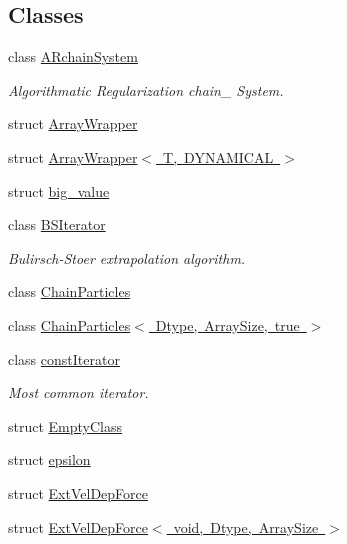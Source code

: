 \subsection*{Classes}
\begin{DoxyCompactItemize}
\item 
class \mbox{\hyperlink{class_space_h_1_1_a_rchain_system}{A\+Rchain\+System}}
\begin{DoxyCompactList}\small\item\em Algorithmatic Regularization chain_ System. \end{DoxyCompactList}\item
struct \mbox{\hyperlink{struct_space_h_1_1_array_wrapper}{Array\+Wrapper}}
\item 
struct \mbox{\hyperlink{struct_space_h_1_1_array_wrapper_3_01_t_00_01_d_y_n_a_m_i_c_a_l_01_4}{Array\+Wrapper$<$ T, D\+Y\+N\+A\+M\+I\+C\+A\+L $>$}}
\item 
struct \mbox{\hyperlink{struct_space_h_1_1big__value}{big\+\_\+value}}
\item 
class \mbox{\hyperlink{class_space_h_1_1_b_s_iterator}{B\+S\+Iterator}}
\begin{DoxyCompactList}\small\item\em Bulirsch-\/\+Stoer extrapolation algorithm. \end{DoxyCompactList}\item 
class \mbox{\hyperlink{class_space_h_1_1_chain_particles}{Chain\+Particles}}
\item 
class \mbox{\hyperlink{class_space_h_1_1_chain_particles_3_01_dtype_00_01_array_size_00_01true_01_4}{Chain\+Particles$<$ Dtype, Array\+Size, true $>$}}
\item 
class \mbox{\hyperlink{class_space_h_1_1const_iterator}{const\+Iterator}}
\begin{DoxyCompactList}\small\item\em Most common iterator. \end{DoxyCompactList}\item 
struct \mbox{\hyperlink{struct_space_h_1_1_empty_class}{Empty\+Class}}
\item 
struct \mbox{\hyperlink{struct_space_h_1_1epsilon}{epsilon}}
\item 
struct \mbox{\hyperlink{struct_space_h_1_1_ext_vel_dep_force}{Ext\+Vel\+Dep\+Force}}
\item 
struct \mbox{\hyperlink{struct_space_h_1_1_ext_vel_dep_force_3_01void_00_01_dtype_00_01_array_size_01_4}{Ext\+Vel\+Dep\+Force$<$ void, Dtype, Array\+Size $>$}}
\item 

\end{DoxyCompactItemize}
